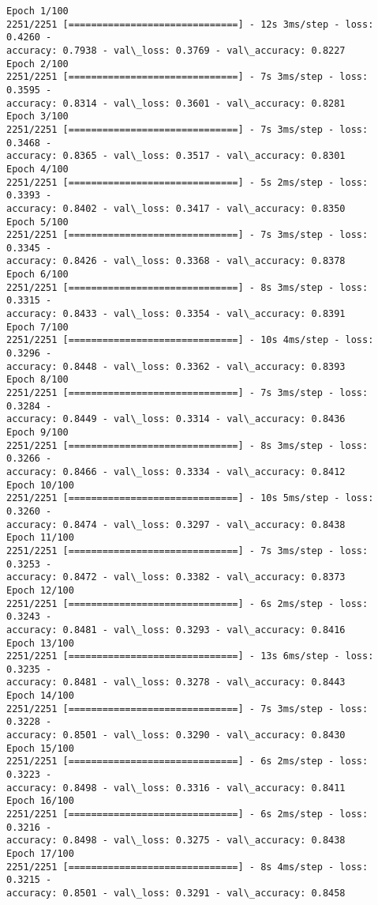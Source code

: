 \documentclass[11pt]{article}
\begin{document}
    \begin{Verbatim}[commandchars=\\\{\}]
Epoch 1/100
2251/2251 [==============================] - 12s 3ms/step - loss: 0.4260 -
accuracy: 0.7938 - val\_loss: 0.3769 - val\_accuracy: 0.8227
Epoch 2/100
2251/2251 [==============================] - 7s 3ms/step - loss: 0.3595 -
accuracy: 0.8314 - val\_loss: 0.3601 - val\_accuracy: 0.8281
Epoch 3/100
2251/2251 [==============================] - 7s 3ms/step - loss: 0.3468 -
accuracy: 0.8365 - val\_loss: 0.3517 - val\_accuracy: 0.8301
Epoch 4/100
2251/2251 [==============================] - 5s 2ms/step - loss: 0.3393 -
accuracy: 0.8402 - val\_loss: 0.3417 - val\_accuracy: 0.8350
Epoch 5/100
2251/2251 [==============================] - 7s 3ms/step - loss: 0.3345 -
accuracy: 0.8426 - val\_loss: 0.3368 - val\_accuracy: 0.8378
Epoch 6/100
2251/2251 [==============================] - 8s 3ms/step - loss: 0.3315 -
accuracy: 0.8433 - val\_loss: 0.3354 - val\_accuracy: 0.8391
Epoch 7/100
2251/2251 [==============================] - 10s 4ms/step - loss: 0.3296 -
accuracy: 0.8448 - val\_loss: 0.3362 - val\_accuracy: 0.8393
Epoch 8/100
2251/2251 [==============================] - 7s 3ms/step - loss: 0.3284 -
accuracy: 0.8449 - val\_loss: 0.3314 - val\_accuracy: 0.8436
Epoch 9/100
2251/2251 [==============================] - 8s 3ms/step - loss: 0.3266 -
accuracy: 0.8466 - val\_loss: 0.3334 - val\_accuracy: 0.8412
Epoch 10/100
2251/2251 [==============================] - 10s 5ms/step - loss: 0.3260 -
accuracy: 0.8474 - val\_loss: 0.3297 - val\_accuracy: 0.8438
Epoch 11/100
2251/2251 [==============================] - 7s 3ms/step - loss: 0.3253 -
accuracy: 0.8472 - val\_loss: 0.3382 - val\_accuracy: 0.8373
Epoch 12/100
2251/2251 [==============================] - 6s 2ms/step - loss: 0.3243 -
accuracy: 0.8481 - val\_loss: 0.3293 - val\_accuracy: 0.8416
Epoch 13/100
2251/2251 [==============================] - 13s 6ms/step - loss: 0.3235 -
accuracy: 0.8481 - val\_loss: 0.3278 - val\_accuracy: 0.8443
Epoch 14/100
2251/2251 [==============================] - 7s 3ms/step - loss: 0.3228 -
accuracy: 0.8501 - val\_loss: 0.3290 - val\_accuracy: 0.8430
Epoch 15/100
2251/2251 [==============================] - 6s 2ms/step - loss: 0.3223 -
accuracy: 0.8498 - val\_loss: 0.3316 - val\_accuracy: 0.8411
Epoch 16/100
2251/2251 [==============================] - 6s 2ms/step - loss: 0.3216 -
accuracy: 0.8498 - val\_loss: 0.3275 - val\_accuracy: 0.8438
Epoch 17/100
2251/2251 [==============================] - 8s 4ms/step - loss: 0.3215 -
accuracy: 0.8501 - val\_loss: 0.3291 - val\_accuracy: 0.8458

\end{Verbatim}
\end{document}
